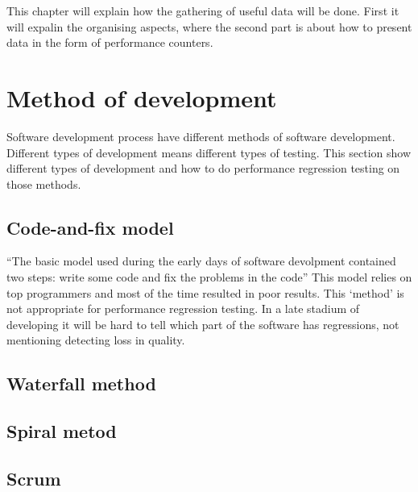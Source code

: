 This chapter will explain how the gathering of useful data will be done. First it will expalin the organising aspects, where the second part is about how to present data in the form of performance counters.
\section{Method of development}
Software development process have different methods of software development. Different types of development means different types of testing. This section show different types of development and how to do performance regression testing on those methods.
\subsection{Code-and-fix model}
``The basic model used during the early days of software devolpment contained two steps: write some code and fix the problems in the code'' \cite{boehm1988spiral} This model relies on top programmers and most of the time resulted in poor results\cite{maccormack2003trade}. This `method' is not appropriate for performance regression testing. In a late stadium of developing it will be hard to tell which part of the software has regressions, not mentioning detecting loss in quality.

\subsection{Waterfall method}
\subsection{Spiral metod}
\subsection{Scrum}